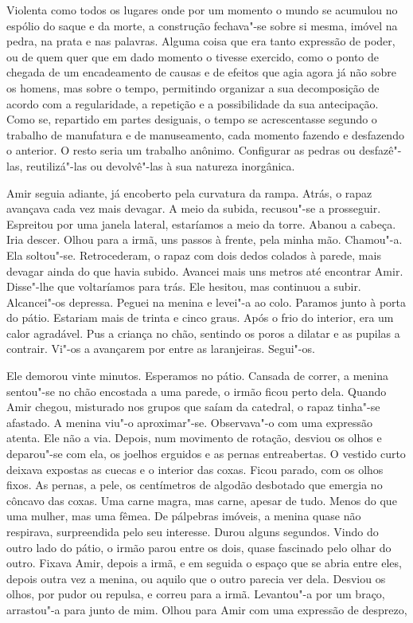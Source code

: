 Violenta como todos os lugares onde por um momento o mundo se acumulou
no espólio do saque e da morte, a construção fechava"-se sobre si mesma,
imóvel na pedra, na prata e nas palavras. Alguma coisa que era tanto
expressão de poder, ou de quem quer que em dado momento o tivesse
exercido, como o ponto de chegada de um encadeamento de causas e de
efeitos que agia agora já não sobre os homens, mas sobre o tempo,
permitindo organizar a sua decomposição de acordo com a regularidade, a
repetição e a possibilidade da sua antecipação. Como se, repartido em
partes desiguais, o tempo se acrescentasse segundo o trabalho de
manufatura e de manuseamento, cada momento fazendo e desfazendo o
anterior. O resto seria um trabalho anônimo. Configurar as pedras ou
desfazê"-las, reutilizá"-las ou devolvê"-las à sua natureza inorgânica.

Amir seguia adiante, já encoberto pela curvatura da rampa. Atrás, o
rapaz avançava cada vez mais devagar. A meio da subida, recusou"-se a
prosseguir. Espreitou por uma janela lateral, estaríamos a meio da
torre. Abanou a cabeça. Iria descer. Olhou para a irmã, uns passos à
frente, pela minha mão. Chamou"-a. Ela soltou"-se. Retrocederam, o rapaz
com dois dedos colados à parede, mais devagar ainda do que havia subido.
Avancei mais uns metros até encontrar Amir. Disse"-lhe que voltaríamos
para trás. Ele hesitou, mas continuou a subir. Alcancei"-os depressa.
Peguei na menina e levei"-a ao colo. Paramos junto à porta do pátio.
Estariam mais de trinta e cinco graus. Após o frio do interior, era um
calor agradável. Pus a criança no chão, sentindo os poros a dilatar e as
pupilas a contrair. Vi"-os a avançarem por entre as laranjeiras.
Segui"-os.

Ele demorou vinte minutos. Esperamos no pátio. Cansada de correr, a
menina sentou"-se no chão encostada a uma parede, o irmão ficou perto
dela. Quando Amir chegou, misturado nos grupos que saíam da catedral, o
rapaz tinha"-se afastado. A menina viu"-o aproximar"-se. Observava"-o
com uma expressão atenta. Ele não a via. Depois, num movimento de
rotação, desviou os olhos e deparou"-se com ela, os joelhos erguidos e
as pernas entreabertas. O vestido curto deixava expostas as cuecas e o
interior das coxas. Ficou parado, com os olhos fixos. As pernas, a pele,
os centímetros de algodão desbotado que emergia no côncavo das coxas.
Uma carne magra, mas carne, apesar de tudo. Menos do que uma mulher, mas
uma fêmea. De pálpebras imóveis, a menina quase não respirava,
surpreendida pelo seu interesse. Durou alguns segundos. Vindo do outro
lado do pátio, o irmão parou entre os dois, quase fascinado pelo olhar
do outro. Fixava Amir, depois a irmã, e em seguida o espaço que se abria
entre eles, depois outra vez a menina, ou aquilo que o outro parecia ver
dela. Desviou os olhos, por pudor ou repulsa, e correu para a irmã.
Levantou"-a por um braço, arrastou"-a para junto de mim. Olhou para Amir
com uma expressão de desprezo,

